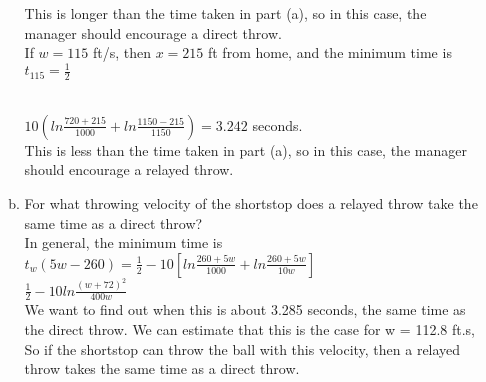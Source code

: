 \documentclass[paper=a4, fontsize=11pt]{scrartcl}
\numberwithin{equation}{section}
\numberwithin{figure}{section}
\numberwithin{table}{section}
\begin{document}
\begin{enumerate}[1.]
\begin{enumerate}[(a)]
		This is longer than the time taken in part (a), so in this case, the manager should encourage a direct throw. \\
\medskip
		If $w = 115$ ft/s, then $x = 215$ ft from home, and the minimum time is $t_{115} = \frac{1}{2}$\\\

		$10(ln\frac{720+215}{1000} + ln\frac{1150-215}{1150}) = 3.242$ seconds. \\
\medskip
This is less than the time taken in part (a), so in this case, the manager should encourage a relayed throw.\\

\bigskip
		\item For what throwing velocity of the shortstop does a relayed throw take the same time as a direct throw? \\
		In general, the minimum time is\\
		$t_w(5w-260) = \frac{1}{2} - 10[ln\frac{260+5w}{1000} + ln\frac{260+5w}{10w}]$\\
		$\frac{1}{2} - 10ln\frac{(w+72)^2}{400w}$\\

\medskip
		We want to find out when this is about 3.285 seconds, the same time as the direct throw. We can estimate that this is the case for w = 112.8 ft.s, So if the shortstop can throw the ball with this 				velocity, then a relayed throw takes the same time as a direct throw.\\



























		\end{enumerate}
\end{enumerate}
\end{document}
